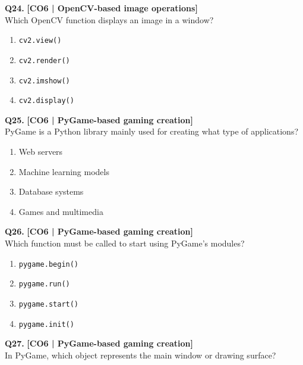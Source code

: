 \noindent\textbf{Q24.} \hfill {\small\color{LPUOrange}\textbf{[CO6 | OpenCV-based image operations]}}\\[2pt]
Which OpenCV function displays an image in a window?

\begin{enumerate}[label=(\alph*),topsep=2pt,itemsep=1pt,partopsep=0pt,parsep=0pt]
    \item \relax \texttt{cv2.view()}
    \item \relax \texttt{cv2.render()}
    \item \relax \texttt{cv2.imshow()}
    \item \relax \texttt{cv2.display()}
\end{enumerate}
\vspace{{2mm}}

\noindent\textbf{Q25.} \hfill {\small\color{LPUOrange}\textbf{[CO6 | PyGame-based gaming creation]}}\\[2pt]
PyGame is a Python library mainly used for creating what type of applications?

\begin{enumerate}[label=(\alph*),topsep=2pt,itemsep=1pt,partopsep=0pt,parsep=0pt]
    \item \relax Web servers
    \item \relax Machine learning models
    \item \relax Database systems
    \item \relax Games and multimedia
\end{enumerate}
\vspace{{2mm}}

\noindent\textbf{Q26.} \hfill {\small\color{LPUOrange}\textbf{[CO6 | PyGame-based gaming creation]}}\\[2pt]
Which function must be called to start using PyGame's modules?

\begin{enumerate}[label=(\alph*),topsep=2pt,itemsep=1pt,partopsep=0pt,parsep=0pt]
    \item \relax \texttt{pygame.begin()}
    \item \relax \texttt{pygame.run()}
    \item \relax \texttt{pygame.start()}
    \item \relax \texttt{pygame.init()}
\end{enumerate}
\vspace{{2mm}}

\noindent\textbf{Q27.} \hfill {\small\color{LPUOrange}\textbf{[CO6 | PyGame-based gaming creation]}}\\[2pt]
In PyGame, which object represents the main window or drawing surface?

